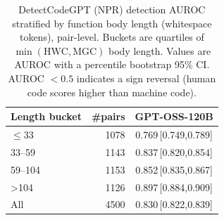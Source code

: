 \begin{table}[t]
\centering
\caption{DetectCodeGPT (NPR) detection AUROC stratified by function body length (whitespace tokens), pair-level. Buckets are quartiles of $\min(\text{HWC},\text{MGC})$ body length. Values are AUROC with a percentile bootstrap 95\% CI. AUROC $<0.5$ indicates a sign reversal (human code scores higher than machine code).}
\label{tab:auroc-by-length}
\begin{tabular}{lrc}
\toprule
Length bucket & \#pairs & GPT-OSS-120B \\
\midrule
$\leq$33 & 1078 & 0.769\,\tiny[0.749,0.789] \\
33--59 & 1143 & 0.837\,\tiny[0.820,0.854] \\
59--104 & 1153 & 0.852\,\tiny[0.835,0.867] \\
>104 & 1126 & 0.897\,\tiny[0.884,0.909] \\
\midrule
All & 4500 & 0.830\,\tiny[0.822,0.839] \\
\bottomrule
\end{tabular}
\end{table}
